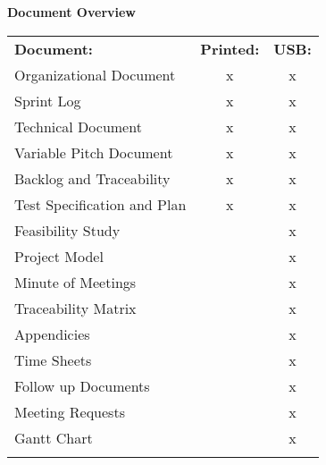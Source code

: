 
\begin{center}
\textbf{\Large Document Overview} \\
\vspace*{0.5cm}
\begin{tabular}{lcc}
\rowcolor{cadetgrey}
\textbf{Document:}    &\textbf{Printed:} 	 &\textbf{USB:}     \\
Organizational Document  & x  &  x     \\ \rowcolor{gainsboro}
Sprint Log  & x  &  x     \\ 
Technical Document  & x  &  x     \\ \rowcolor{gainsboro}
Variable Pitch Document  & x  &  x     \\ 
Backlog and Traceability  & x  &  x     \\ \rowcolor{gainsboro}
Test Specification and Plan  & x  &  x     \\ 
Feasibility Study  &   &  x     \\ \rowcolor{gainsboro}
Project Model  &   &  x     \\ 
Minute of Meetings  &   &  x     \\ \rowcolor{gainsboro}
Traceability Matrix  &   &  x     \\ 
Appendicies  &   &  x     \\ \rowcolor{gainsboro}
Time Sheets  &   &  x     \\ 
Follow up Documents  &  &  x     \\ \rowcolor{gainsboro}
Meeting Requests  &   &  x     \\ 
Gantt Chart  &  &  x     \\ \rowcolor{gainsboro}
\end{tabular}                                                                   
\end{center}
